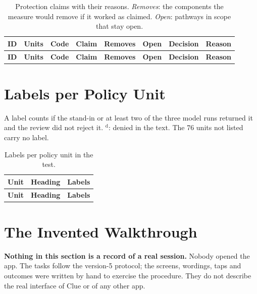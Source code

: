 \begin{landscape}
{\footnotesize
\begin{longtable}{@{}lp{1.3cm}p{1.4cm}p{4.3cm}p{1.2cm}p{1.2cm}p{1.6cm}p{5.6cm}@{}}
\caption[Protection claims with their reasons]{Protection claims with their reasons. \emph{Removes}: the components
the measure would remove if it worked as claimed. \emph{Open}: pathways in scope that stay open.}
\label{tab:test-claims-full}\\
\toprule
\textbf{ID} & \textbf{Units} & \textbf{Code} & \textbf{Claim} & \textbf{Removes} & \textbf{Open} & \textbf{Decision} & \textbf{Reason} \\
\midrule
\endfirsthead
\toprule
\textbf{ID} & \textbf{Units} & \textbf{Code} & \textbf{Claim} & \textbf{Removes} & \textbf{Open} & \textbf{Decision} & \textbf{Reason} \\
\midrule
\endhead
\end{longtable}}
\end{landscape}

\section{Labels per Policy Unit}
A label counts if the stand-in or at least two of the three model runs returned it and the review did not
reject it. $^{\mathrm{d}}$: denied in the text. The 76 units not listed carry no label.

{\footnotesize
\begin{longtable}{@{}lp{6.2cm}p{6.6cm}@{}}
\caption[Labels per policy unit in the test]{Labels per policy unit in the test.}
\label{tab:test-units}\\
\toprule
\textbf{Unit} & \textbf{Heading} & \textbf{Labels} \\
\midrule
\endfirsthead
\toprule
\textbf{Unit} & \textbf{Heading} & \textbf{Labels} \\
\midrule
\endhead
\end{longtable}}

\section[The Invented Walkthrough]{The Invented Walkthrough \synthtag}
\textbf{Nothing in this section is a record of a real session.} Nobody opened the app. The tasks follow the
version-5 protocol; the screens, wordings, taps and outcomes were written by hand to exercise the procedure. They do not
describe the real interface of Clue or of any other app.


